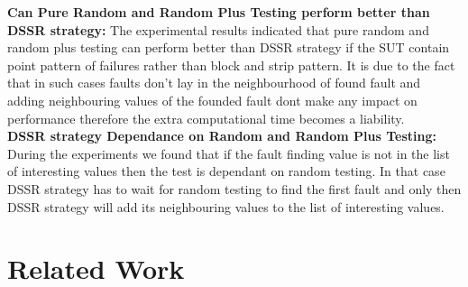 \documentclass[conference]{IEEEtran}
\begin{document}
\indent \textbf{Can Pure Random and Random Plus Testing perform better than DSSR strategy:}
The experimental results indicated that pure random and random plus testing can perform better than DSSR strategy if the SUT contain point pattern of failures rather than block and strip pattern. It is due to the fact that in such cases faults don't lay in the neighbourhood of found fault and adding neighbouring values of the founded fault dont make any impact on performance therefore the extra computational time becomes a liability.\\
\indent \textbf{DSSR strategy Dependance on Random and Random Plus Testing:}
During the experiments we found that if the fault finding value is not in the list of interesting values then the test is dependant on random testing. In that case DSSR strategy has to wait for random testing to find the first fault and only then DSSR strategy will add its neighbouring values to the list of interesting values.



\section{Related Work}\label{sec:rw}

\end{document}
